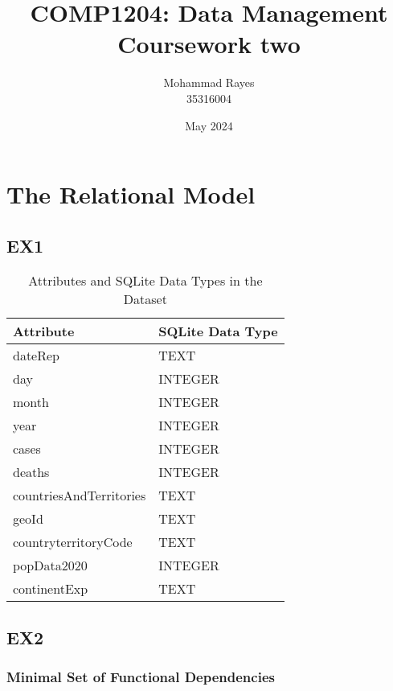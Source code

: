 \documentclass{article}
\title{COMP1204: Data Management \\ Coursework two }
\author{Mohammad Rayes \\35316004}\date{May 2024}
\begin{document}
\maketitle
\newpage
\section{The Relational Model}
\subsection{EX1} 
\begin{table}[H] %
\centering
\begin{tabular}{|l|l|}
\hline
\textbf{Attribute}                & \textbf{SQLite Data Type} \\ \hline
dateRep                           & TEXT                      \\ \hline
day                               & INTEGER                   \\ \hline
month                             & INTEGER                   \\ \hline
year                              & INTEGER                   \\ \hline
cases                             & INTEGER                   \\ \hline
deaths                            & INTEGER                   \\ \hline
countriesAndTerritories           & TEXT                      \\ \hline
geoId                             & TEXT                      \\ \hline
countryterritoryCode              & TEXT                      \\ \hline
popData2020                       & INTEGER                   \\ \hline
continentExp                      & TEXT                      \\ \hline
\end{tabular}
\caption{Attributes and SQLite Data Types in the Dataset}
\end{table}
\subsection{EX2}
\subsubsection{Minimal Set of Functional Dependencies}
\end{document}
